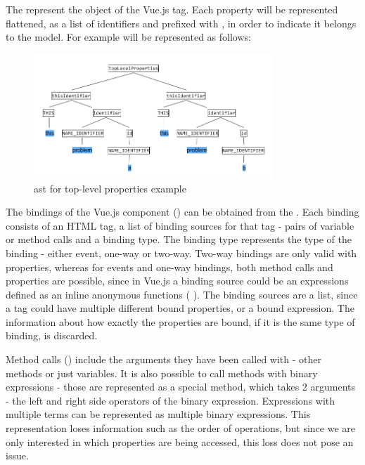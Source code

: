 The  represent the  object of the Vue.js  tag. Each property will be represented flattened, as a list of identifiers and prefixed with , in order to indicate it belongs to the model. For example  will be represented as follows:

\begin{figure}[H]
    \centering
    \includegraphics[width=0.8\textwidth]{images/ast_top_level.png}
     \caption{\gls{ast} for top-level properties example }
     \label{fig:ast_top_level}
\end{figure}

The bindings of the Vue.js component () can be obtained from the . Each binding consists of an HTML tag, a list of binding sources for that tag - pairs of variable or method calls and a binding type. The binding type represents the type of the binding - either event, one-way or two-way. Two-way bindings are only valid with properties, whereas for events and one-way bindings, both method calls and properties are possible, since in Vue.js a binding source could be an expressions defined as an inline anonymous functions (
). The binding sources are a list, since a tag could have multiple different bound properties, or a bound expression. The information about how exactly the properties are bound, if it is the same type of binding, is discarded.

Method calls () include the arguments they have been called with - other methods or just variables. It is also possible to call methods with binary expressions - those are represented as a special method, which takes 2 arguments - the left and right side operators of the binary expression. Expressions with multiple terms can be represented as multiple binary expressions. This representation loses information such as the order of operations, but since we are only interested in which properties are being accessed, this loss does not pose an issue.

